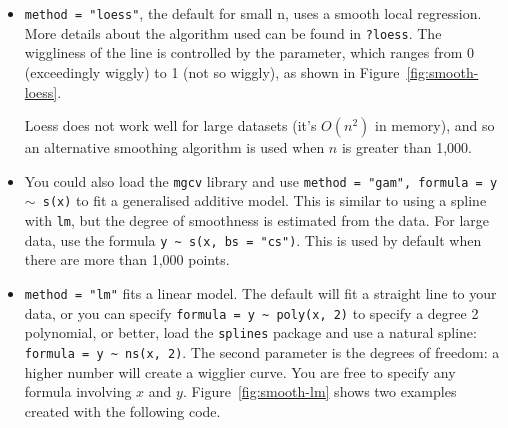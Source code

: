 \begin{itemize}
  \item {\tt method = "loess"}, the default for small n, uses a smooth local regression.  More details about the algorithm used can be found in {\tt ?loess}.  The wiggliness of the line is controlled by the  parameter, which ranges from 0 (exceedingly wiggly) to 1 (not so wiggly), as shown in Figure~\ref{fig:smooth-loess}.  
  
    
  
  \noindent Loess does not work well for large datasets (it's $O(n^2)$ in memory), and so an alternative smoothing algorithm is used when $n$ is greater than 1,000.

  \item You could also load the {\tt mgcv} library and use {\tt method = "gam", formula = y $\sim$ s(x)} to fit a generalised additive model. This is similar to using a spline with {\tt lm}, but the degree of smoothness is estimated from the data.  For large data, use the formula {\tt y \verb|~| s(x, bs = "cs")}.  This is used by default when there are more than 1,000 points. 
 

    

  \item {\tt method = "lm"} fits a linear model.  The default will fit a straight line to your data, or you can specify {\tt formula = y \verb|~| poly(x, 2)} to specify a degree 2 polynomial, or better, load the {\tt splines} package and use a natural spline: {\tt formula = y \verb|~| ns(x, 2)}. The second parameter is the degrees of freedom: a higher number will create a wigglier curve. You are free to specify any formula involving $x$ and $y$.  Figure~\ref{fig:smooth-lm} shows two examples created with the following code.  


\end{itemize}
